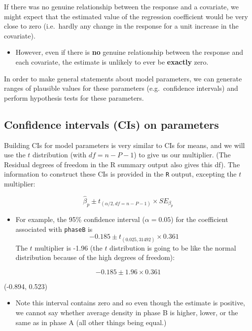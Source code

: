 \documentclass[
  oneside]{krantz}
\providecommand{\tightlist}{%
  \setlength{\itemsep}{0pt}\setlength{\parskip}{0pt}}
\begin{document}
If there was no genuine relationship between the response and a covariate, we might expect that the estimated value of the regression coefficient would be very close to zero (i.e.~hardly any change in the response for a unit increase in the covariate).

\begin{itemize}
\tightlist
\item
  However, even if there is \textbf{no} genuine relationship between the response and each covariate, the estimate is unlikely to ever be \textbf{exactly} zero.
\end{itemize}

In order to make general statements about model parameters, we can generate ranges of plausible values for these parameters (e.g.~confidence intervals) and perform hypothesis tests for these parameters.

\hypertarget{confidence-intervals-cis-on-parameters}{%
\subsection{Confidence intervals (CIs) on parameters}\label{confidence-intervals-cis-on-parameters}}

Building CIs for model parameters is very similar to CIs for means, and we will use the \(t\) distribution (with \(df=n-P-1\)) to give us our multiplier. (The Residual degrees of freedom in the R summary output also gives this df). The information to construct these CIs is provided in the \texttt{R} output, excepting the \(t\) multiplier:

\[
\hat{\beta}_p \pm t_{(\alpha/2, df=n-P-1)} \times SE_{\beta_p}
\]

\begin{itemize}
\tightlist
\item
  For example, the 95\% confidence interval (\(\alpha=0.05\)) for the coefficient associated with \texttt{phaseB} is
  \[ -0.185 \pm t_{(0.025, 31492)}\times 0.361\]
  The \(t\) multiplier is -1.96 (the \(t\) distribution is going to be like the normal distribution because of the high degrees of freedom):
\end{itemize}

\[ -0.185 \pm 1.96\times 0.361\]

(-0.894, 0.523)

\begin{itemize}
\tightlist
\item
  Note this interval contains zero and so even though the estimate is positive, we cannot say whether average density in phase B is higher, lower, or the same as in phase A (all other things being equal.)
\end{itemize}
\end{document}
